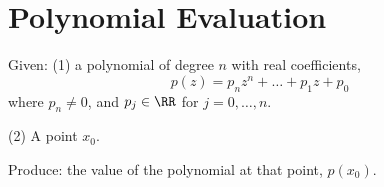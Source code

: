 \chapter{Polynomial Evaluation}

\begin{problem}
  Given: (1) a polynomial of degree $n$ with real coefficients,
  \begin{equation*}
    p(z) = p_{n}z^{n} + \dots + p_{1}z + p_{0}
  \end{equation*}
  where $p_{n}\neq0$, and $p_{j}\in\RR$ for $j=0,\dots,n$.

  (2) A point $x_{0}$.

  Produce: the value of the polynomial at that point, $p(x_{0})$.
\end{problem}




